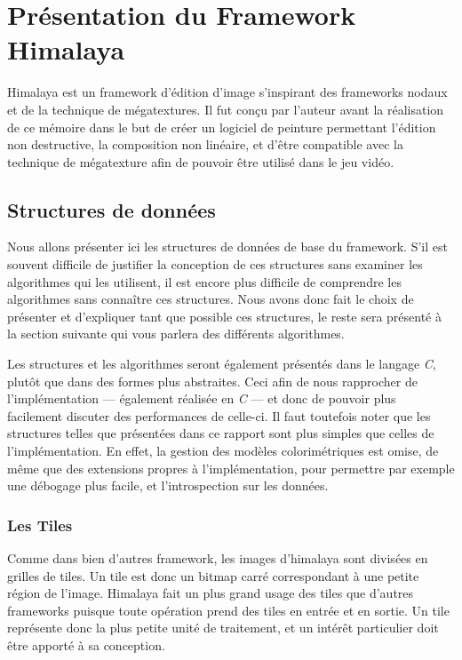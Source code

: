 \chapter{Présentation du Framework Himalaya}
	Himalaya est un framework d'édition d'image s'inspirant des frameworks nodaux et de la technique de mégatextures. Il fut conçu par l'auteur avant la
	réalisation de ce mémoire dans le but de créer un logiciel de peinture permettant l'édition non destructive, la composition non linéaire, et d'être
	compatible avec la technique de mégatexture afin de pouvoir être utilisé dans le jeu vidéo. 


	\section{Structures de données}
		Nous allons présenter ici les structures de données de base du framework. S'il est souvent difficile de justifier la conception de ces structures
		sans examiner les algorithmes qui les utilisent, il est encore plus difficile de comprendre les algorithmes sans connaître ces structures.
		Nous avons donc fait le choix de présenter et d'expliquer tant que possible ces structures, le reste sera présenté à la section suivante qui
		vous parlera des différents algorithmes.

		Les structures et les algorithmes seront également présentés dans le langage \emph{C}, plutôt que dans des formes plus abstraites. Ceci afin de nous
		rapprocher de l'implémentation --- également réalisée en \emph{C} --- et donc de pouvoir plus facilement discuter des performances de celle-ci. 
		Il faut toutefois noter que les structures telles que présentées dans ce rapport sont plus simples que celles de l'implémentation. En effet, 
		la gestion des modèles colorimétriques est omise, de même que des extensions propres à l'implémentation, pour permettre par exemple une
		débogage plus facile, et l'introspection sur les données. 

		\subsection{Les Tiles}
		Comme dans bien d'autres framework, les images d'himalaya sont divisées en grilles de tiles. Un tile est donc un bitmap carré correspondant
		à une petite région de l'image. Himalaya fait un plus grand usage des tiles que d'autres frameworks puisque toute opération prend des tiles
		en entrée et en sortie. Un tile représente donc la plus petite unité de traitement, et un intérêt particulier doit être apporté à sa conception.

